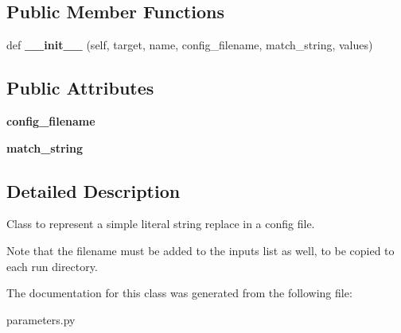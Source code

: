 \subsection*{Public Member Functions}
\begin{DoxyCompactItemize}
\item 
\mbox{\label{classcodar_1_1cheetah_1_1parameters_1_1_param_config_abd78d773a411f8f4ec4b1cddec865644}} 
def {\bfseries \+\_\+\+\_\+init\+\_\+\+\_\+} (self, target, name, config\+\_\+filename, match\+\_\+string, values)
\end{DoxyCompactItemize}
\subsection*{Public Attributes}
\begin{DoxyCompactItemize}
\item 
\mbox{\label{classcodar_1_1cheetah_1_1parameters_1_1_param_config_a1ea95ac063d51462e652eb8dc4aa22e2}} 
{\bfseries config\+\_\+filename}
\item 
\mbox{\label{classcodar_1_1cheetah_1_1parameters_1_1_param_config_a00bbc6874525462353e4b2b8d187dcce}} 
{\bfseries match\+\_\+string}
\end{DoxyCompactItemize}


\subsection{Detailed Description}
\begin{DoxyVerb}Class to represent a simple literal string replace in a config file.

Note that the filename must be added to the inputs list as well, to be
copied to each run directory.
\end{DoxyVerb}
 

The documentation for this class was generated from the following file\+:\begin{DoxyCompactItemize}
\item 
parameters.\+py\end{DoxyCompactItemize}
